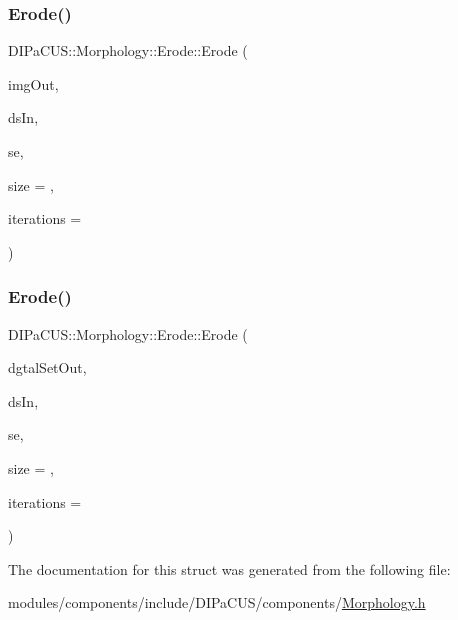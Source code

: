 \subsubsection{\texorpdfstring{Erode()}{Erode()}\hspace{0.1cm}{\footnotesize\ttfamily [1/2]}}
{\footnotesize\ttfamily D\+I\+Pa\+C\+U\+S\+::\+Morphology\+::\+Erode\+::\+Erode (\begin{DoxyParamCaption}\item[{\mbox{\hyperlink{namespaceDIPaCUS_1_1Morphology_a9aff9edf28d681accfc54435fbefcbee}{Image2D}} \&}]{img\+Out,  }\item[{const \mbox{\hyperlink{namespaceDIPaCUS_1_1Morphology_ab69fa725716b0ed4c311c0d00a292be7}{Digital\+Set}} \&}]{ds\+In,  }\item[{\mbox{\hyperlink{namespaceDIPaCUS_1_1Morphology_a60b552d68432e7992f09717070d9c4e7}{Structuring\+Element}}}]{se,  }\item[{int}]{size = {},  }\item[{int}]{iterations = {} }\end{DoxyParamCaption})}

\mbox{\label{structDIPaCUS_1_1Morphology_1_1Erode_a187a3befe8428a76a503a70a20a40f07}} 
\subsubsection{\texorpdfstring{Erode()}{Erode()}\hspace{0.1cm}{\footnotesize\ttfamily [2/2]}}
{\footnotesize\ttfamily D\+I\+Pa\+C\+U\+S\+::\+Morphology\+::\+Erode\+::\+Erode (\begin{DoxyParamCaption}\item[{\mbox{\hyperlink{namespaceDIPaCUS_1_1Morphology_ab69fa725716b0ed4c311c0d00a292be7}{Digital\+Set}} \&}]{dgtal\+Set\+Out,  }\item[{const \mbox{\hyperlink{namespaceDIPaCUS_1_1Morphology_ab69fa725716b0ed4c311c0d00a292be7}{Digital\+Set}} \&}]{ds\+In,  }\item[{\mbox{\hyperlink{namespaceDIPaCUS_1_1Morphology_a60b552d68432e7992f09717070d9c4e7}{Structuring\+Element}}}]{se,  }\item[{int}]{size = {},  }\item[{int}]{iterations = {} }\end{DoxyParamCaption})}



The documentation for this struct was generated from the following file\+:\begin{DoxyCompactItemize}
\item 
modules/components/include/\+D\+I\+Pa\+C\+U\+S/components/\mbox{\hyperlink{Morphology_8h}{Morphology.\+h}}\end{DoxyCompactItemize}
